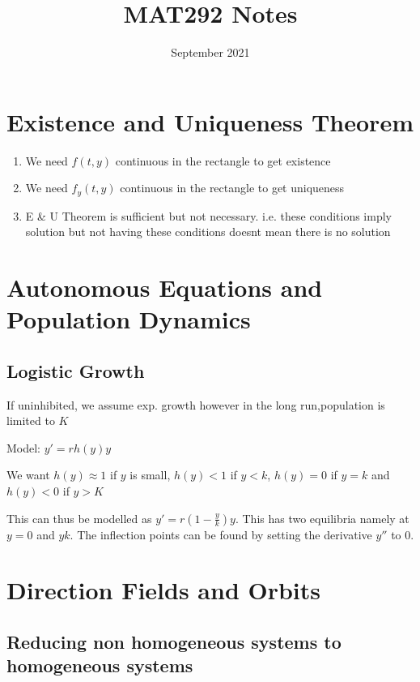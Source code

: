 \documentclass{article}
\title{MAT292 Notes}
\date{September 2021}
\begin{document}
\maketitle

\section{Existence and Uniqueness Theorem}

\begin{enumerate}
    \item We need $f(t,y)$ continuous in the rectangle to get existence
    \item We need $f_y(t,y)$ continuous in the rectangle to get uniqueness
    \item E \& U Theorem is sufficient but not necessary. i.e. these conditions imply solution but not having these conditions doesnt mean there is no solution
\end{enumerate}

\section{Autonomous Equations and Population Dynamics}

\subsection{Logistic Growth}

If uninhibited, we assume exp. growth however in the long run,population is limited to $K$

Model: $y' = r h(y) y$

We want $h(y) \approx 1$ if $y$ is small, $h(y) < 1$ if $y < k$, $h(y) = 0 $ if $y=k$ and $h(y) < 0$ if $y>K$ 

This can thus be modelled as $y' = r(1 - \frac{y}{k})y$. This has two equilibria namely at $y=0$ and $yk$. The inflection points can be found by setting the derivative $y''$ to 0.

\section{Direction Fields and Orbits}

\subsection{Reducing non homogeneous systems to homogeneous systems}
\end{document}
